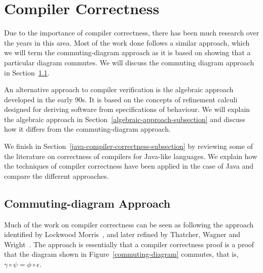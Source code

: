 \documentclass[a4paper,10pt]{report}
\begin{document}
\section{Compiler Correctness}
\label{compiler-correctness-section}

Due to the importance of compiler correctness, there has been much
research over the years in this area.
Most of the work done follows a similar approach, which we will term
the commuting-diagram approach as it is based on showing that a
particular diagram commutes.
We will discuss the commuting diagram approach in
Section~\ref{commuting-diagram-subsection}.

An alternative approach to compiler verification is the algebraic
approach developed in the early 90s.
It is based on the concepts of refinement calculi designed for
deriving software from specifications of behaviour.
We will explain the algebraic approach in
Section~\ref{algebraic-approach-subsection} and discuss how it differs
from the commuting-diagram approach.

We finish in Section~\ref{java-compiler-correctness-subsection} by
reviewing some of the literature on correctness of compilers for
Java-like languages.
We explain how the techniques of compiler correctness have been
applied in the case of Java and compare the different approaches.

\subsection{Commuting-diagram Approach}
\label{commuting-diagram-subsection}

Much of the work on compiler correctness can be seen as following the
approach identified by Lockwood Morris~\cite{morris1973}, and later
refined by Thatcher, Wagner and Wright~\cite{thatcher1979}.
The approach is essentially that a compiler correctness proof is a
proof that the diagram shown in Figure~\ref{commuting-diagram}
commutes, that is, $\gamma \circ \psi = \phi \circ \epsilon$.
\end{document}
